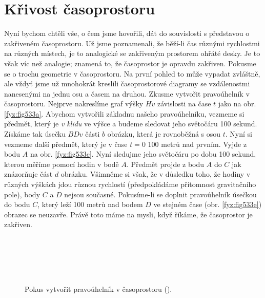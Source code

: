   \section{Křivost časoprostoru}\label{fyz:IIchapXVLIIsecVII}
    Nyní bychom chtěli vše, o čem jsme hovořili, dát do souvislosti s představou o zakřiveném 
    časoprostoru. Už jsme poznamenali, že běží-li čas různými rychlostmi na různých místech, je to 
    analogické se zakřiveným prostorem ohřáté desky. Je to však víc než analogie; znamená to, že 
    časoprostor je opravdu zakřiven. Pokusme se o trochu geometrie v časoprostoru. Na první pohled 
    to může vypadat zvláštně, ale vždyť jsme už mnohokrát kreslili časoprostorové diagramy se 
    vzdálenostmi nanesenými na jednu osu a časem na druhou. Zkusme vytvořit pravoúhelník v 
    časoprostoru. Nejprve nakreslíme graf výšky \(Hv\) závislosti na čase \(t\) jako na obr. 
    \ref{fyz:fig533a}. Abychom vytvořili základnu našeho pravoúhelníku, vezmeme si předmět, který 
    je \emph{v klidu} ve výšce a budeme sledovat jeho světočáru \num{100} sekund. Získáme tak 
    úsečku \(BDv\) části \(b\) obrázku, která je rovnoběžná s osou \(t\). Nyní si vezmeme další 
    předmět, který je v čase \(t = 0\) \num{100} metrů nad prvním. Vyjde z bodu \(A\) na obr. 
    \ref{fyz:fig533c}. Nyní sledujme jeho světočáru po dobu \num{100} sekund, kterou měříme pomocí 
    hodin v bodě \(A\). Předmět projde z bodu \(A\) do \(C\) jak znázorňuje část \(d\) obrázku. 
    Všimněme si však, že v důsledku toho, že hodiny v různých výškách jdou různou rychlostí 
    (předpokládáme přítomnost gravitačního pole), body \(C\) a \(D\) nejsou současné. Pokusíme-li 
    se doplnit pravoúhelník úsečkou do bodu \(C\), který leží \num{100} metrů nad bodem \(D\) ve 
    stejném čase (obr. \ref{fyz:fig533e}) obrazec se neuzavře. Právě toto máme na mysli, když 
    říkáme, že časoprostor je zakřiven.
    
    \begin{figure}[ht!] %
      \centering  
          \\
          \\
          \\
          \\
      \caption{Pokus vytvořit pravoúhelník v časoprostoru (\cite[s.~790]{Feynman02}).}
      \label{fyz:fig533}
    \end{figure}     

